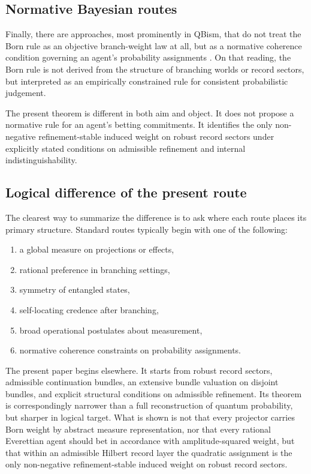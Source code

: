 \documentclass[11pt]{article}
\theoremstyle{remark}
\numberwithin{equation}{section}
\begin{document}
\subsection{Normative Bayesian routes}

Finally, there are approaches, most prominently in QBism, that do not treat the Born rule as an objective branch-weight law at all, but as a normative coherence condition governing an agent's probability assignments \cite{FuchsSchack2013}. On that reading, the Born rule is not derived from the structure of branching worlds or record sectors, but interpreted as an empirically constrained rule for consistent probabilistic judgement.

The present theorem is different in both aim and object. It does not propose a normative rule for an agent's betting commitments. It identifies the only non-negative refinement-stable induced weight on robust record sectors under explicitly stated conditions on admissible refinement and internal indistinguishability.

\subsection{Logical difference of the present route}

The clearest way to summarize the difference is to ask where each route places its primary structure. Standard routes typically begin with one of the following:
\begin{enumerate}[label=(\roman*)]
\item a global measure on projections or effects,
\item rational preference in branching settings,
\item symmetry of entangled states,
\item self-locating credence after branching,
\item broad operational postulates about measurement,
\item normative coherence constraints on probability assignments.
\end{enumerate}

The present paper begins elsewhere. It starts from robust record sectors, admissible continuation bundles, an extensive bundle valuation on disjoint bundles, and explicit structural conditions on admissible refinement. Its theorem is correspondingly narrower than a full reconstruction of quantum probability, but sharper in logical target. What is shown is not that every projector carries Born weight by abstract measure representation, nor that every rational Everettian agent should bet in accordance with amplitude-squared weight, but that within an admissible Hilbert record layer the quadratic assignment is the only non-negative refinement-stable induced weight on robust record sectors.
\end{document}
